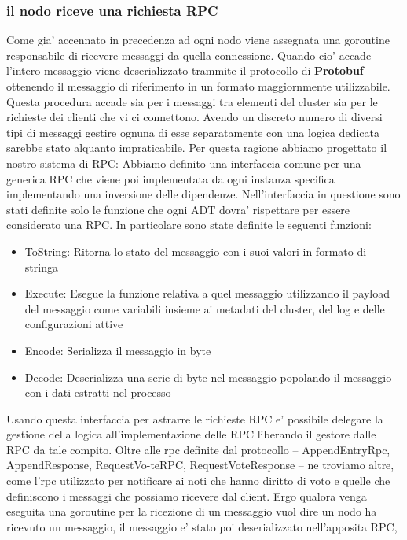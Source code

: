 \subsubsection{il nodo riceve una richiesta RPC\\}
Come gia' accennato in precedenza ad ogni nodo viene assegnata una goroutine responsabile di
ricevere messaggi da quella connessione. Quando cio' accade l'intero messaggio viene deserializzato
trammite il protocollo di \textbf{Protobuf} ottenendo il messaggio di riferimento in un formato 
maggiornmente utilizzabile. Questa procedura accade sia per i messaggi tra elementi del cluster
sia per le richieste dei clienti che vi ci connettono. Avendo un discreto numero di diversi tipi di
messaggi gestire ognuna di esse separatamente con una logica dedicata sarebbe stato alquanto
impraticabile. Per questa ragione abbiamo progettato il nostro sistema di RPC:
Abbiamo definito una interfaccia comune per una generica RPC che viene poi implementata da
ogni instanza specifica implementando una inversione delle dipendenze. Nell'interfaccia in questione
sono stati definite solo le funzione che ogni ADT dovra' rispettare per essere considerato 
una RPC. In particolare sono state definite le seguenti funzioni:
\begin{itemize}
    \item ToString: Ritorna lo stato del messaggio con i suoi valori in formato di stringa
    \item Execute: Esegue la funzione relativa a quel messaggio utilizzando il payload del messaggio
        come variabili insieme ai metadati del cluster, del log e delle configurazioni attive
    \item Encode: Serializza il messaggio in byte
    \item Decode: Deserializza una serie di byte nel messaggio popolando il messaggio con i dati
        estratti nel processo
\end{itemize}
Usando questa interfaccia per astrarre le richieste RPC e' possibile delegare la gestione della logica
all'implementazione delle RPC liberando il gestore dalle RPC da tale compito. 
Oltre alle rpc definite dal protocollo – AppendEntryRpc, AppendResponse, RequestVo-teRPC, 
RequestVoteResponse – ne troviamo altre, come l’rpc utilizzato per notificare ai noti che hanno 
diritto di voto e quelle che definiscono i messaggi che possiamo ricevere dal client.
Ergo qualora venga eseguita una goroutine per la ricezione di un messaggio vuol dire
un nodo ha ricevuto un messaggio, il messaggio e' stato poi deserializzato nell'apposita RPC,
